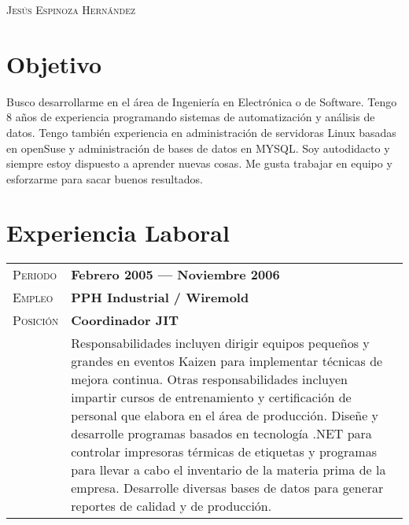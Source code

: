 \documentclass[letter, oneside, final]{scrartcl} %
\newcommand{\gray}{\rowcolor[gray]{.90}} %
\begin{document}
\begin{center} %


{\fontsize{26}{26}\selectfont\scshape Jes\'us Espinoza Hern\'andez} %

\vspace{1.5cm} %


\section{Objetivo}

Busco desarrollarme en el área de Ingeniería en Electrónica o de Software. Tengo 8 años de experiencia programando sistemas de automatización y análisis de datos. Tengo también experiencia en administración de servidoras Linux basadas en openSuse y administración de bases de datos en MYSQL. Soy autodidacto y siempre estoy dispuesto a aprender nuevas cosas. Me gusta trabajar en equipo y esforzarme para sacar buenos resultados.


\section{Experiencia Laboral}

\begin{tabularx}{0.97\linewidth}{>{\raggedleft\scshape}p{2cm}X}
\gray Periodo & \textbf{Febrero 2005 --- Noviembre 2006}\\
\gray Empleo & \textbf{PPH Industrial / Wiremold} \\ %
\gray Posición & \textbf{Coordinador JIT}\\
& Responsabilidades incluyen dirigir equipos peque\~nos y grandes en eventos Kaizen para implementar técnicas de mejora continua. Otras responsabilidades incluyen impartir cursos de entrenamiento y certificación de personal que elabora en el área de producción. Diseñe y desarrolle programas basados en tecnología .NET para controlar impresoras térmicas de etiquetas y programas para llevar a cabo el inventario de la materia prima de la empresa. Desarrolle diversas bases de datos para generar reportes de calidad y de producción.
\end{tabularx}


\end{center}
\end{document}
